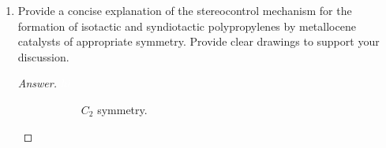 \documentclass[../psets.tex]{subfiles}
\begin{document}
\begin{enumerate}
\begin{proof}[Answer]
    \end{proof}
    \item Provide a concise explanation of the stereocontrol mechanism for the formation of isotactic and syndiotactic polypropylenes by metallocene catalysts of appropriate symmetry. Provide clear drawings to support your discussion.
    \begin{proof}[Answer]
        ${\color{white}hi}$
        \begin{figure}[H]
            \centering
            \begin{subfigure}[b]{0.3\linewidth}
                \centering
                \caption{$C_2$ symmetry.}
                \label{fig:catalysts-polypropylenea}
            \end{subfigure}
            \begin{subfigure}[b]{0.3\linewidth}
                \centering
\end{subfigure}
\end{figure}
\end{proof}
\end{enumerate}
\end{document}
